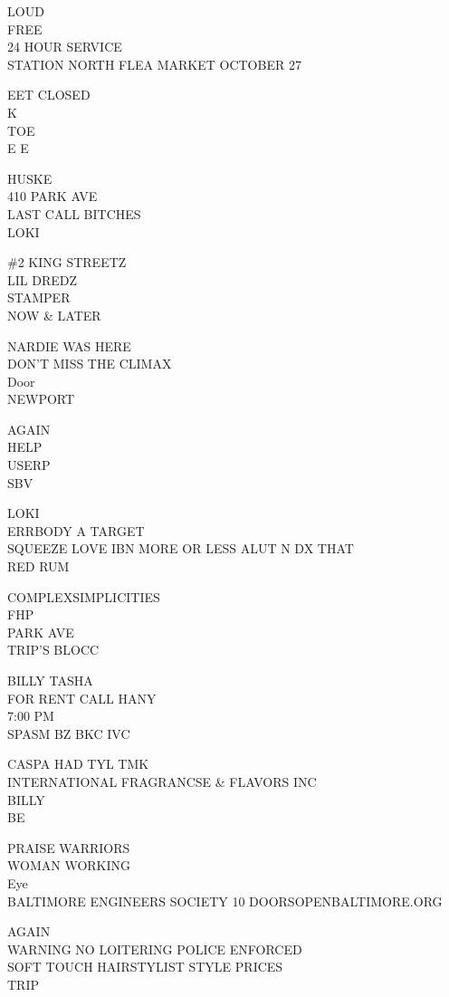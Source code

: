 \documentclass[10pt,letterpaper]{article}
\begin{document}
LOUD\\
FREE\\
24 HOUR SERVICE\\
STATION NORTH FLEA MARKET OCTOBER 27

EET CLOSED\\
K\\
TOE\\
E E

HUSKE\\
410 PARK AVE\\
LAST CALL BITCHES\\
LOKI

\#2 KING STREETZ\\
LIL DREDZ\\
STAMPER\\
NOW \& LATER

NARDIE WAS HERE\\
DON'T MISS THE CLIMAX\\
Door\\
NEWPORT

AGAIN\\
HELP\\
USERP\\
SBV

LOKI\\
ERRBODY A TARGET\\
SQUEEZE LOVE IBN MORE OR LESS ALUT N DX THAT\\
RED RUM

COMPLEXSIMPLICITIES\\
FHP\\
PARK AVE\\
TRIP'S BLOCC

BILLY TASHA\\
FOR RENT CALL HANY\\
7:00 PM\\
SPASM BZ BKC IVC

CASPA HAD TYL TMK\\
INTERNATIONAL FRAGRANCSE \& FLAVORS INC\\
BILLY\\
BE

PRAISE WARRIORS\\
WOMAN WORKING\\
Eye\\
BALTIMORE ENGINEERS SOCIETY 10 DOORSOPENBALTIMORE.ORG

AGAIN\\
WARNING NO LOITERING POLICE ENFORCED\\
SOFT TOUCH HAIRSTYLIST STYLE PRICES\\
TRIP
\end{document}
